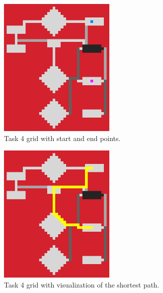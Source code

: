 \documentclass{article}
\begin{document}
    \begin{figure}[H]
        \centering
        \includegraphics[width=0.5\textwidth]{Images/p2t4_start.png}
        \caption[Task 1 startgrid]{Task 4 grid with start and end points.}
        \label{fig:Task 4 startgrid}
    \end{figure}

    \begin{figure}[H]
        \centering
        \includegraphics[width=0.5\textwidth]{Images/p2t4_finish.png}
        \caption[Task 1 endgrid]{Task 4 grid with visualization of the shortest path.}
        \label{fig:Task 4 endgrid}
    \end{figure}

\end{document}
